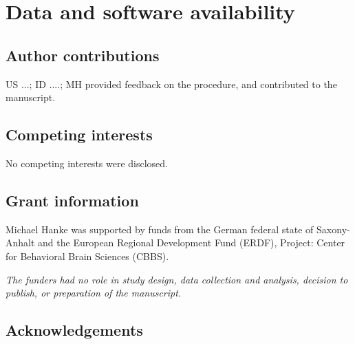 \documentclass[10pt,a4paper,twocolumn]{article}
\begin{document}
\section*{Data and software availability}


\subsection*{Author contributions}
US ...; ID ....; MH provided feedback on the procedure, and contributed to the manuscript.

\subsection*{Competing interests}
No competing interests were disclosed.

\subsection*{Grant information}
Michael Hanke was supported by funds from the German federal state of
Saxony-Anhalt and the European Regional Development Fund (ERDF), 
Project: Center for Behavioral Brain Sciences (CBBS).

\textit{The funders had no role in study design, data collection and analysis,
decision to publish, or preparation of the manuscript.}

\subsection*{Acknowledgements}
\end{document}
